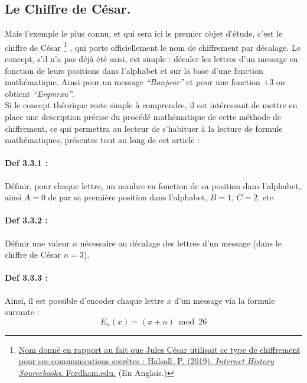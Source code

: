 \documentclass{article}
\begin{document}
\clearpage

\subsection{Le Chiffre de César.}\label{le-chiffre-de-cesar.}

Mais l'exemple le plus connu, et qui sera ici le premier objet d'étude, c'est le chiffre de César \footnote{\href{https://sourcebooks.fordham.edu/ancient/suetonius-julius.asp}{Nom donné en rapport au fait que Jules César utilisait ce type de chiffrement pour ses communications secrètes : Halsall, P. (2019). \textit{Internet History Sourcebooks}. Fordham.edu.} (En Anglais.)}
, qui porte officiellement le nom de chiffrement par décalage. Le concept, s'il n'a pas déjà été saisi, est simple : décaler les lettres d'un message en fonction de leurs positions dans l'alphabet et sur la base d'une fonction mathématique. Ainsi pour un message \textit{``Bonjour''} et pour une fonction \(+3\) on obtient \textit{``Erqmrxu''}.\\ 

Si le concept théorique reste simple à comprendre, il est intéressant de mettre en place une description précise du procédé mathématique de cette méthode de chiffrement, ce qui permettra au lecteur de s'habituer à la lecture de formule mathématiques, présentes tout au long de cet article :

\paragraph{Def 3.3.1 :}\label{def-3.3.1}

Définir, pour chaque lettre,
un nombre en fonction de sa position dans l'alphabet, ainsi \(A = 0\) de
par sa première position dans l'alphabet, \(B = 1\), \(C = 2\), etc.

\paragraph{Def 3.3.2 :}\label{def-3.3.2}

Définir une valeur \(n\) nécessaire au décalage des lettres d'un message
(dans le chiffre de César \(n=3\)).

\paragraph{Def 3.3.3 :}\label{def-3.3.3}

Ainsi, il est possible d'encoder chaque lettre \(x\) d'un message via la
formule suivante : \[
E_n(x)=(x+n)\bmod26
\] 
\end{document}
